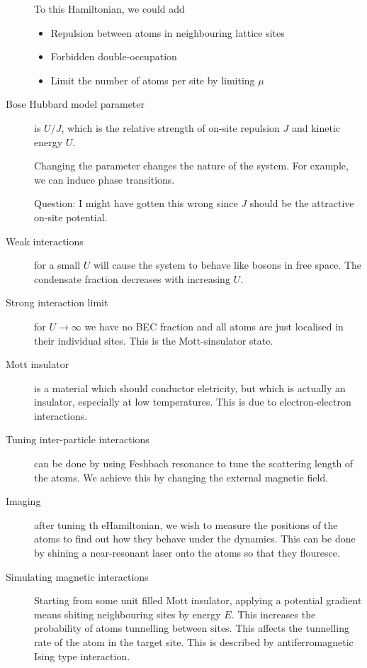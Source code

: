 \begin{description}
To this Hamiltonian, we could add
\begin{itemize}
\item Repulsion between atoms in neighbouring lattice sites
\item Forbidden double-occupation
\item Limit the number of atoms per site by limiting $\mu$
\end{itemize}

\item[Bose Hubbard model parameter] is $U/J$, which is the relative strength of on-site repulsion $J$ and kinetic energy $U$. 

Changing the parameter changes the nature of the system. For example, we can induce phase transitions. 

Question: I might have gotten this wrong since $J$ should be the attractive on-site potential. 


\item[Weak interactions] for a small $U$ will cause the system to behave like bosons in free space. The condensate fraction decreases with increasing $U$. 

\item[Strong interaction limit] for $U \rightarrow \infty$ we have no BEC fraction and all atoms are just localised in their individual sites. This is the Mott-sinsulator state. 

\item[Mott insulator] is a material which should conductor eletricity, but which is actually an insulator, especially at low temperatures. This is due to electron-electron interactions. 


\item[Tuning inter-particle interactions] can be done by using Feshbach resonance to tune the scattering length of the atoms. We achieve this by changing the external magnetic field. 

\item[Imaging] after tuning th eHamiltonian, we wish to measure the positions of the atoms to find out how they behave under the dynamics. This can be done by shining a near-resonant laser onto the atoms so that they flouresce. 

\item[Simulating magnetic interactions] Starting from some unit filled Mott insulator, applying a potential gradient means shiting neighbouring sites by energy $E$. This increases the probability of atoms tunnelling between sites. This affects the tunnelling rate of the atom in the target site. This is described by antiferromagnetic Ising type interaction. 

\end{description}
